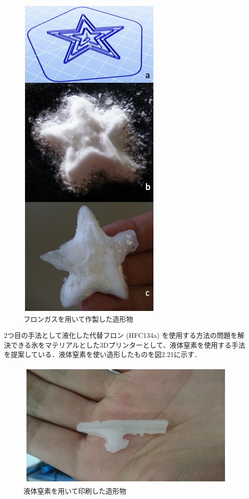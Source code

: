 \begin{figure}[H]
  \centering
  \includegraphics[width=6truecm]{./fig/erusa1.jpg}
  \caption{フロンガスを用いて作製した造形物}
  \label{fig:ferret}
\end{figure}

2つ目の手法として液化した代替フロン (HFC134a) を使用する方法の問題を解決できる氷をマテリアルとした3Dプリンターとして、液体窒素を使用する手法を提案している．液体窒素を使い造形したものを図2.21に示す．

\begin{figure}[H]
  \centering
  \includegraphics[width=10truecm]{./fig/erusa2.jpg}
  \caption{液体窒素を用いて印刷した造形物}
  \label{fig:ferret}
\end{figure}

